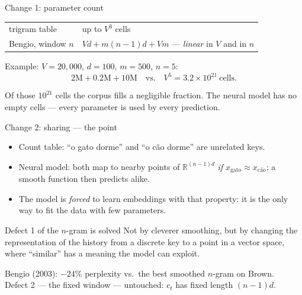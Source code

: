 \documentclass[11pt,aspectratio=169]{beamer}
\newcommand{\R}{\mathbb{R}}
\begin{document}
\begin{frame}{Change 1: parameter count}
  \begin{center}
  \begin{tabular}{@{}ll@{}}
    \toprule
    trigram table & up to $V^3$ cells \\
    Bengio, window $n$ & $Vd + m(n-1)d + Vm$ \quad --- \emph{linear} in $V$ and in $n$ \\
    \bottomrule
  \end{tabular}
  \end{center}

  \vspace{0.8em}
  Example: $V = 20{,}000$, $d = 100$, $m = 500$, $n = 5$:
  \[
    2\text{M} + 0.2\text{M} + 10\text{M} \quad\text{vs.}\quad V^5 = 3.2\times 10^{21}\ \text{cells.}
  \]

  \vspace{0.6em}
  Of those $10^{21}$ cells the corpus fills a negligible fraction. The neural model has no
  empty cells --- every parameter is used by every prediction.
\end{frame}

\begin{frame}{Change 2: sharing --- the point}
  \begin{itemize}
    \item Count table: ``o gato dorme'' and ``o cão dorme'' are unrelated keys.
    \item Neural model: both map to nearby points of $\R^{(n-1)d}$ \emph{if}
          $x_{\text{gato}}\approx x_{\text{cão}}$; a smooth function then predicts alike.
    \item The model is \emph{forced} to learn embeddings with that property: it is the only
          way to fit the data with few parameters.
  \end{itemize}

  \vspace{0.8em}
  \begin{block}{Defect 1 of the $n$-gram is solved}
    Not by cleverer smoothing, but by changing the representation of the history from a
    discrete key to a point in a vector space, where ``similar'' has a meaning the model
    can exploit.
  \end{block}

  \vspace{0.5em}
  Bengio (2003): $-24\%$ perplexity vs.\ the best smoothed $n$-gram on Brown.\\
  Defect 2 --- the fixed window --- untouched: $c_t$ has fixed length $(n-1)d$.
\end{frame}
\end{document}
